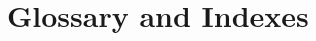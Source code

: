 \backmatter

\part*{Glossary and Indexes}
\pagestyle{empty}

\renewcommand{\nomname}{Glossary of Terms}
\printnomenclature
\cleardoublepage

\printindex[tech]
\cleardoublepage

\printindex[subject]
\cleardoublepage


